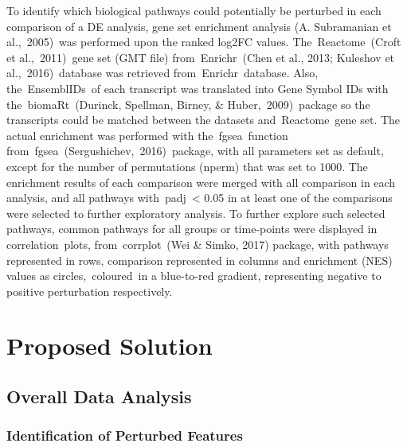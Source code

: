 \documentclass[
]{book}
\begin{document}
To identify which biological pathways could potentially be perturbed in each comparison of a DE analysis, gene set enrichment analysis (A. Subramanian et al.,~2005)⁠~was performed upon the ranked log2FC values. The~Reactome~(Croft et al.,~2011)⁠~gene set (GMT file) from~Enrichr~(Chen et al., 2013; Kuleshov et al.,~2016)⁠~database was retrieved from~Enrichr~database. Also, the~EnsemblIDs~of each transcript was translated into Gene Symbol IDs with the~biomaRt~(Durinck, Spellman, Birney, \& Huber,~2009)⁠~package so the transcripts could be matched between the datasets and~Reactome~gene set. The actual enrichment was performed with the~fgsea~function from~fgsea~(Sergushichev,~2016)⁠~package, with all parameters set as default, except for the number of permutations (nperm) that was set to 1000. The enrichment results of each comparison were merged with all comparison in each analysis, and all pathways with~padj~\textless{} 0.05 in at least one of the comparisons were selected to further exploratory analysis. To further explore such selected pathways, common pathways for all groups or time-points were displayed in correlation~plots, from~corrplot~(Wei \& Simko, 2017)⁠ package, with pathways represented in rows, comparison represented in columns and enrichment (NES) values as circles,~coloured~in a blue-to-red gradient, representing negative to positive perturbation respectively.

\hypertarget{proposed-solution}{%
\section{Proposed Solution}\label{proposed-solution}}

\hypertarget{overall-data-analysis}{%
\subsection{Overall Data Analysis}\label{overall-data-analysis}}

\hypertarget{identification-of-perturbed-features}{%
\subsubsection{Identification of Perturbed Features}\label{identification-of-perturbed-features}}
\end{document}
